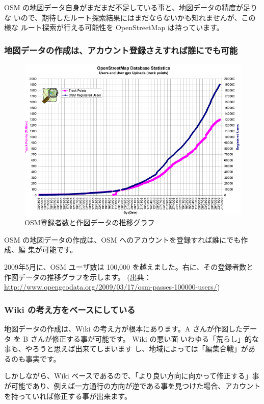 \documentclass[mingoth,a4paper]{jsarticle}
\begin{document}
OSM の地図データ自身がまだまだ不足している事と、地図データの精度が足りな
いので、期待したルート探索結果にはまだならないかも知れませんが、この様な
ルート探索が行える可能性を OpenStreetMap は持っています。

\subsubsection{地図データの作成は、アカウント登録さえすれば誰にでも可能}

\begin{figure}
 \includegraphics[scale=0.5]{image200912/debianosm3.png}
 \caption{OSM登録者数と作図データの推移グラフ}
\end{figure}

OSM の地図データの作成は、OSM へのアカウントを登録すれば誰にでも作成、編
集が可能です。

2009年5月に、OSM ユーザ数は 100,000 を越えました。右に、その登録者数と
作図データの推移グラフを示します。
(出典：\url{http://www.opengeodata.org/2009/03/17/osm-passes-100000-users/})

\clearpage

\subsubsection{Wiki の考え方をベースにしている}

地図データの作成は、Wiki の考え方が根本にあります。A さんが作図したデータ
を B さんが修正する事が可能です。
Wiki の悪い面 いわゆる「荒らし」的な事も、やろうと思えば出来てしまいます
し、地域によっては「編集合戦」があるのも事実です。

しかしながら、Wiki ベースであるので、「より良い方向に向かって修正する」事
が可能であり、例えば一方通行の方向が逆である事を見つけた場合、アカウント
を持っていれば修正する事が出来ます。
\end{document}
